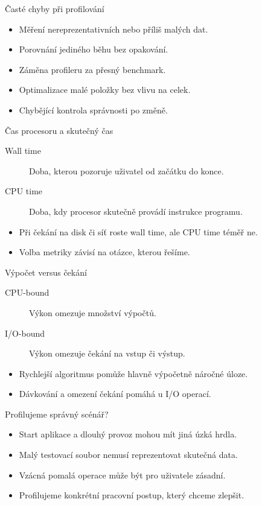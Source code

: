 \documentclass[aspectratio=169]{beamer}
\begin{document}
\begin{frame}{Časté chyby při profilování}
\begin{itemize}
\item Měření nereprezentativních nebo příliš malých dat.
\item Porovnání jediného běhu bez opakování.
\item Záměna profileru za přesný benchmark.
\item Optimalizace malé položky bez vlivu na celek.
\item Chybějící kontrola správnosti po změně.
\end{itemize}
\end{frame}

\begin{frame}{Čas procesoru a skutečný čas}
\begin{description}
\item[Wall time] Doba, kterou pozoruje uživatel od začátku do konce.
\item[CPU time] Doba, kdy procesor skutečně provádí instrukce programu.
\end{description}
\begin{itemize}
\item Při čekání na disk či síť roste wall time, ale CPU time téměř ne.
\item Volba metriky závisí na otázce, kterou řešíme.
\end{itemize}
\end{frame}

\begin{frame}{Výpočet versus čekání}
\begin{description}
\item[CPU-bound] Výkon omezuje množství výpočtů.
\item[I/O-bound] Výkon omezuje čekání na vstup či výstup.
\end{description}
\begin{itemize}
\item Rychlejší algoritmus pomůže hlavně výpočetně náročné úloze.
\item Dávkování a omezení čekání pomáhá u I/O operací.
\end{itemize}
\end{frame}

\begin{frame}{Profilujeme správný scénář?}
\begin{itemize}
\item Start aplikace a dlouhý provoz mohou mít jiná úzká hrdla.
\item Malý testovací soubor nemusí reprezentovat skutečná data.
\item Vzácná pomalá operace může být pro uživatele zásadní.
\item Profilujeme konkrétní pracovní postup, který chceme zlepšit.
\end{itemize}
\end{frame}
\end{document}
